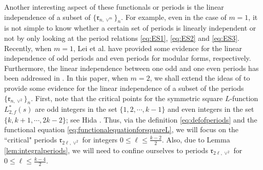\documentclass[11pt,letterpaper,reqno]{amsart}
\numberwithin{figure}{section}
\numberwithin{table}{section}
\theoremstyle{definition}
\theoremstyle{plain}
\theoremstyle{definition}
\theoremstyle{definition}
\theoremstyle{remark}
\numberwithin{equation}{section}
\theoremstyle{remark}
\begin{document}
Another interesting aspect of these functionals or periods is the linear independence of a subset of $\{\mathfrak{r}_{n,\vee^m}\}_n$. For example, even in the case of $m=1$, it is not simple to know whether a certain set of periods is linearly independent or not by only looking at the period relations \eqref{eq:ES1}, \eqref{eq:ES2} and \eqref{eq:ES3}. 
Recently, when $m=1$, Lei et al. \cite{oddperiods,evenperiods} have provided some evidence for the linear independence of odd periods and even periods for modular forms, respectively. Furthermore, the linear independence between one odd and one even periods has been addressed in \cite{Xueoddandevenperiods}.
In this paper, when $m=2$, we shall extend the ideas of \cite{oddperiods,evenperiods} to provide some evidence for the linear independence of a subset of the periods $\{\mathfrak{r}_{n,\vee^2}\}_n$. First, note that the critical points for the symmetric square $L$-function $L^{\ast}_{2,f}(s)$ are odd integers in the set $\{1,2,\cdots,k-1\}$ and even integers in the set $\{k,k+1,\cdots, 2k-2\}$; see Hida \cite[p.~96]{Hida1990}. Thus, via the definition \eqref{eq:defofperiods} and the functional equation \eqref{eq:functionalequationforsquareL}, we will focus on  the ``critical" periods $\mathfrak{r}_{2\ell,\vee^2}$ for integers $0\le \ell\le \frac{k-2}{2}$. Also, due to Lemma \ref{lem:integralperiods}, we will need to confine ourselves to periods $\mathfrak{r}_{2\ell,\vee^2}$ for $0\le\ell\le\frac{k-4}{2}$.
\end{document}

